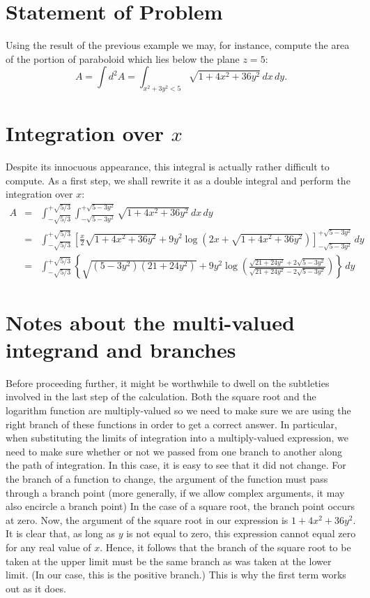\documentclass[12pt]{article}
\begin{document}
\section{Statement of Problem}

Using the result of the previous example we may, for instance, compute the area of the portion of paraboloid which lies below the plane $z = 5$:
 $$A = \int d^2 A = \int_{x^2 + 3 y^2 < 5} \sqrt{1 + 4 x^2 + 36 y^2 } \, dx \, dy. $$

\section{Integration over $x$}

Despite its innocuous appearance, this integral is actually rather difficult to compute.  As a first step, we shall rewrite it as a double integral and perform the integration over $x$:
\begin{eqnarray*}
A &=& \int_{-\sqrt{5/3}}^{+\sqrt{5/3}} \int_{-\sqrt{5 - 3 y^2}}^{+\sqrt{5 - 3 y^2}} \sqrt{ 1 + 4 x^2 + 36 y^2 } \, dx \, dy \\
&=& \int_{-\sqrt{5/3}}^{+\sqrt{5/3}} \left[ \frac{x}{2} \sqrt{ 1 + 4 x^2 + 36 y^2 } + 9 y^2 \log \left( 2x + \sqrt{ 1 + 4 x^2 + 36 y^2 } \right) \right]_{-\sqrt{5 - 3 y^2}}^{+\sqrt{5 - 3 y^2}} \, dy \\
&=& \int_{-\sqrt{5/3}}^{+\sqrt{5/3}} \left\{ \sqrt{ (5 - 3 y^2) (21 + 24 y^2) } + 9 y^2 \log \left( \frac{\sqrt{21 + 24 y^2} + 2 \sqrt{5 - 3 y^2}}{\sqrt{21 + 24 y^2} - 2 \sqrt{5 - 3 y^2}} \right) \right\} \, dy
\end{eqnarray*}
 
\section{Notes about the multi-valued integrand and branches}

Before proceeding further, it might be worthwhile to dwell on the subtleties involved in the last step of the calculation.  Both the square root and the 
logarithm function are multiply-valued so we need to make sure we are using the right branch of these functions in order to get a correct answer.  In particular, when substituting the limits of integration into a multiply-valued expression, we need to make sure whether or not we passed from one branch to another along the path of integration.  In this case, it is easy to see that it did not change.  For the branch of a function to change, the argument of the function must pass through a branch point (more generally, if we allow complex arguments, it may also encircle a branch point)  In the case of a square root, the branch point occurs at zero.  Now, the argument of the square root in our expression is $1 + 4 x^2 + 36 y^2$.  It is clear that, as long as $y$ is not equal to zero,  this expression cannot equal zero for any real value of $x$.  Hence, it follows that the branch of the square root to be taken at the upper limit must be the same branch as was taken at the lower limit. (In our case, this is the positive branch.)  This is why the first term works out as it does.
\end{document}
